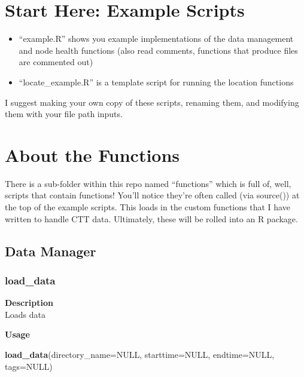 \documentclass[
]{book}
\newenvironment{Shaded}{\begin{snugshade}}{\end{snugshade}}
\newcommand{\DataTypeTok}[1]{\textcolor[rgb]{0.13,0.29,0.53}{#1}}
\newcommand{\KeywordTok}[1]{\textcolor[rgb]{0.13,0.29,0.53}{\textbf{#1}}}
\newcommand{\NormalTok}[1]{#1}
\newcommand{\OtherTok}[1]{\textcolor[rgb]{0.56,0.35,0.01}{#1}}
\providecommand{\tightlist}{%
  \setlength{\itemsep}{0pt}\setlength{\parskip}{0pt}}
\begin{document}
\hypertarget{start-here-example-scripts}{%
\chapter{Start Here: Example Scripts}\label{start-here-example-scripts}}

\begin{itemize}
\tightlist
\item
  ``example.R'' shows you example implementations of the data management and node health functions (also read comments, functions that produce files are commented out)
\item
  ``locate\_example.R'' is a template script for running the location functions
\end{itemize}

I suggest making your own copy of these scripts, renaming them, and modifying them with your file path inputs.

\hypertarget{about-the-functions}{%
\chapter{About the Functions}\label{about-the-functions}}

There is a sub-folder within this repo named ``functions'' which is full of, well, scripts that contain functions! You'll notice they're often called (via source()) at the top of the example scripts. This loads in the custom functions that I have written to handle CTT data. Ultimately, these will be rolled into an R package.

\hypertarget{data-manager}{%
\section{Data Manager}\label{data-manager}}

\hypertarget{load_data}{%
\subsection{load\_data}\label{load_data}}

\textbf{Description}\\
Loads data

\textbf{Usage}

\begin{Shaded}
\begin{Highlighting}[]
\KeywordTok{load_data}\NormalTok{(}\DataTypeTok{directory_name=}\OtherTok{NULL}\NormalTok{, }\DataTypeTok{starttime=}\OtherTok{NULL}\NormalTok{, }\DataTypeTok{endtime=}\OtherTok{NULL}\NormalTok{, }\DataTypeTok{tags=}\OtherTok{NULL}\NormalTok{)  }
\end{Highlighting}
\end{Shaded}
\end{document}
